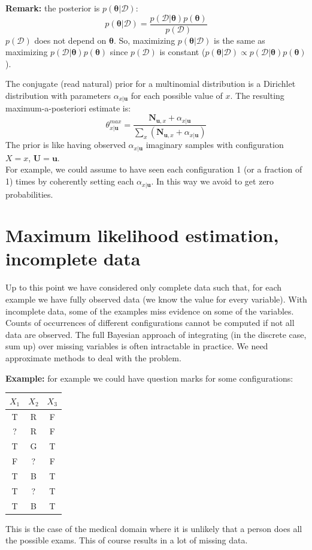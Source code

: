 \textbf{Remark:} the posterior is $p(\pmb{\theta}|\mathcal{D})$:
\[
	p(\pmb{\theta}|\mathcal{D}) = \frac{p(\mathcal{D}|\pmb{\theta}) p(\pmb{\theta})}{p(\mathcal{D})}
\]
$p(\mathcal{D})$ does not depend on $\pmb{\theta}$. So, maximizing
$p(\pmb{\theta}|\mathcal{D})$ is the same as maximizing
$p(\mathcal{D}|\pmb{\theta})p(\pmb{\theta})$ since $p(\mathcal{D})$ is constant
($p(\pmb{\theta}|\mathcal{D}) \propto p(\mathcal{D}|\pmb{\theta}) p(\pmb{\theta})$).
\newline

The conjugate (read natural) prior for a multinomial distribution is a Dirichlet
distribution with parameters $\alpha_{x|\pmb{u}}$ for each possible value of $x$.
The resulting maximum-a-posteriori estimate is:
\begin{equation}
	\theta^{\mathit{max}}_{x|\pmb{u}}= \frac{\pmb{N}_{\pmb{u},x}+ \alpha_{x|\pmb{u}}}{\sum_{x}
	(\pmb{N}_{\pmb{u},x}+ \alpha_{x|\pmb{u}})}
\end{equation}
The prior is like having observed $\alpha_{x|\pmb{u}}$ imaginary samples with
configuration $X=x$, $\pmb{U}=\pmb{u}$. \\ For example, we could assume to have seen
each configuration 1 (or a fraction of 1) times by coherently setting each $\alpha
_{x|\pmb{u}}$. In this way we avoid to get zero probabilities.

\section{Maximum likelihood estimation, incomplete data}
Up to this point we have considered only complete data such that, for each example
we have fully observed data (we know the value for every variable). With
incomplete data, some of the examples miss evidence on some of the variables.
Counts of occurrences of different configurations cannot be computed if not all
data are observed. The full Bayesian approach of integrating (in the discrete
case, sum up) over missing variables is often intractable in practice. We need approximate
methods to deal with the problem.
\newline

\textbf{Example:} for example we could have question marks for some
configurations:
\begin{center}
	\begin{tabular}{ |c|c|c| }
		$X_{1}$ & $X_{2}$ & $X_{3}$ \\
		\hline
		T       & R       & F       \\
		?       & R       & F       \\
		T       & G       & T       \\
		F       & ?       & F       \\
		T       & B       & T       \\
		T       & ?       & T       \\
		T       & B       & T       \\
	\end{tabular}
\end{center}
This is the case of the medical domain where it is unlikely that a person does all
the possible exams. This of course results in a lot of missing data.
\newline

